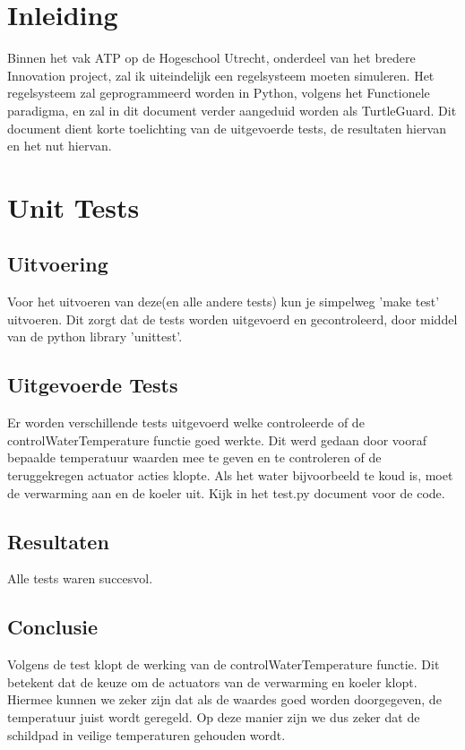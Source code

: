 \documentclass[a4paper]{report}
\newcommand{\turtleguard}{\mbox{TurtleGuard\texttrademark}\xspace}
\begin{document}
\tableofcontents


\clearpage  %

\chapter{Inleiding}
Binnen het vak ATP op de Hogeschool Utrecht, onderdeel van het bredere Innovation project, zal ik uiteindelijk een regelsysteem moeten simuleren.
Het regelsysteem zal geprogrammeerd worden in Python, volgens het Functionele paradigma, en zal in dit document verder aangeduid worden als \turtleguard.
Dit document dient korte toelichting van de uitgevoerde tests, de resultaten hiervan en het nut hiervan.

\chapter{Unit Tests}
\section{Uitvoering}
Voor het uitvoeren van deze(en alle andere tests) kun je simpelweg 'make test' uitvoeren. Dit zorgt dat de tests worden uitgevoerd en gecontroleerd, door middel van de python library 'unittest'.
\section{Uitgevoerde Tests}
Er worden verschillende tests uitgevoerd welke controleerde of de controlWaterTemperature functie goed werkte.
Dit werd gedaan door vooraf bepaalde temperatuur waarden mee te geven en te controleren of de teruggekregen actuator acties klopte.
Als het water bijvoorbeeld te koud is, moet de verwarming aan en de koeler uit. Kijk in het test.py document voor de code.

\section{Resultaten}
Alle tests waren succesvol.

\section{Conclusie}
Volgens de test klopt de werking van de controlWaterTemperature functie. Dit betekent dat de keuze om de actuators van de verwarming en koeler klopt.
Hiermee kunnen we zeker zijn dat als de waardes goed worden doorgegeven, de temperatuur juist wordt geregeld.
Op deze manier zijn we dus zeker dat de schildpad in veilige temperaturen gehouden wordt.
\end{document}
